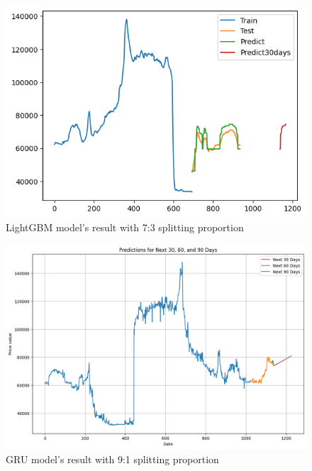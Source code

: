 \documentclass{ieeeojies}
\begin{document}
\vspace{-1em}

\begin{figure}[H]
  \centering
  \begin{minipage}{0.8\linewidth}
    \centering
    \includegraphics[width=\linewidth]{bibliography/Figure/LightGBM_DP3(7_3).png}
    \caption{LightGBM model's result with 7:3 splitting proportion}
    \label{fig8}
  \end{minipage}
\end{figure}

\vspace{-1em}

\begin{figure}[H]
  \centering
  \begin{minipage}{0.8\linewidth}
    \centering
    \includegraphics[width=\linewidth]{bibliography/Figure/DP3_GRU.png}
    \caption{GRU model's result with 9:1 splitting proportion}
    \label{fig8}
  \end{minipage}
\end{figure}
\end{document}
